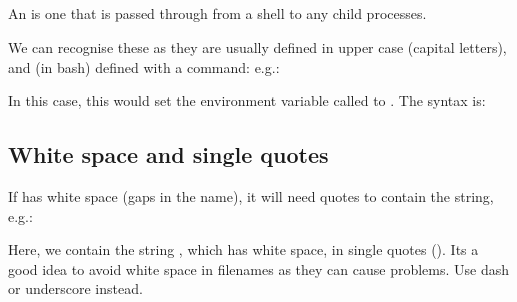 \documentclass[letterpaper,10pt,english]{sphinxmanual}
\begin{document}
\subsection{}
\label{\detokenize{Appendix1:export}}
An  is one that is passed through from a shell to any child processes.

We can recognise these as they are usually defined in upper case (capital letters), and (in bash) defined with a  command: e.g.:

\begin{sphinxVerbatim}[commandchars=\\\{\}]
 
\end{sphinxVerbatim}

In this case, this would set the environment variable called  to . The syntax is:

\begin{sphinxVerbatim}[commandchars=\\\{\}]
 
\end{sphinxVerbatim}


\subsection{White space and single quotes \sphinxstyleliteralintitle{\sphinxupquote{\textquotesingle{}}}}
\label{\detokenize{Appendix1:White-space-and-single-quotes-'}}
If  has white space (gaps in the name), it will need quotes to contain the string, e.g.:

\begin{sphinxVerbatim}[commandchars=\\\{\}]
 
\end{sphinxVerbatim}

Here, we contain the string , which has white space, in single quotes (\sphinxcode{\sphinxupquote{\textquotesingle{}}}). Its a good idea to avoid white space in filenames as they can cause problems. Use dash \sphinxcode{\sphinxupquote{\sphinxhyphen{}}} or underscore \sphinxcode{\sphinxupquote{\_}} instead.
\end{document}
